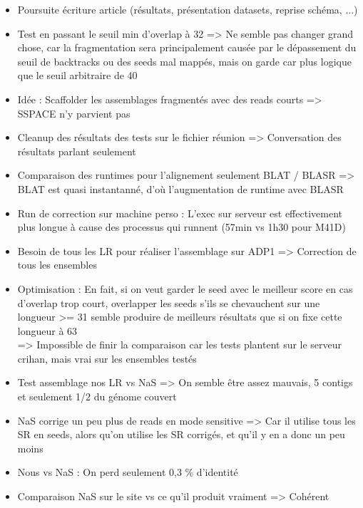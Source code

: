 \documentclass[12pt]{report}
\begin{document}
\begin{itemize}
	\item Poursuite écriture article (résultats, présentation datasets, reprise schéma, ...)
	
	\item Test en passant le seuil min d'overlap à 32 => Ne semble pas changer grand chose, car la fragmentation sera principalement causée
		  par le dépassement du seuil de backtracks ou des seeds mal mappés, mais on garde car plus logique que le seuil arbitraire de 40
	
	\item Idée : Scaffolder les assemblages fragmentés avec des reads courts => SSPACE n'y parvient pas
	
	\item Cleanup des résultats des tests sur le fichier réunion => Conversation des résultats parlant seulement
	
	\item Comparaison des runtimes pour l'alignement seulement BLAT / BLASR => BLAT est quasi instantanné, d'où l'augmentation de runtime avec BLASR
	
	\item Run de correction sur machine perso : L'exec sur serveur est effectivement plus longue à cause des processus qui runnent (57min vs
		  1h30 pour M41D)
		  
	\item Besoin de tous les LR pour réaliser l'assemblage sur ADP1 => Correction de tous les ensembles
	
	\item Optimisation : En fait, si on veut garder le seed avec le meilleur score en cas d'overlap trop court, overlapper les seeds s'ils se chevauchent
		  sur une longueur >= 31 semble produire de meilleurs résultats que si on fixe cette longueur à 63 \\
		  => Impossible de finir la comparaison car les tests plantent sur le serveur crihan, mais vrai sur les ensembles testés
		  
	\item Test assemblage nos LR vs NaS => On semble être assez mauvais, 5 contigs et seulement 1/2 du génome couvert
	
	\item NaS corrige un peu plus de reads en mode sensitive => Car il utilise tous les SR en seeds, alors qu'on utilise les SR corrigés,
		  et qu'il y en a donc un peu moins
		  
	\item Nous vs NaS : On perd seulement 0,3 \% d'identité		  
		  
	\item Comparaison NaS sur le site vs ce qu'il produit vraiment => Cohérent  
\end{itemize}
\end{document}

